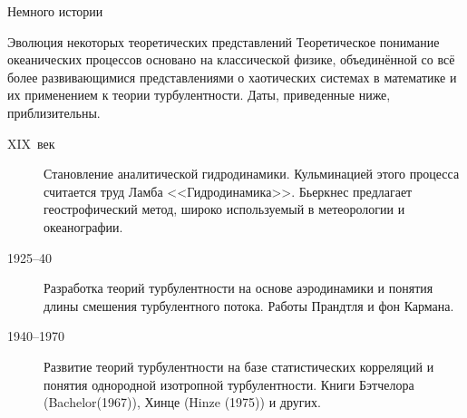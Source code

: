 \begin{chapter}{Немного истории}
\begin{section}{Эволюция некоторых теоретических представлений}
Теоретическое понимание океанических процессов основано на
классической физике, объединённой со всё более развивающимися
представлениями о хаотических системах в математике и их применением
к теории турбулентности. Даты, приведенные ниже, приблизительны.
%

\begin{description}
\item[XIX~век] Становление аналитической гидродинамики. Кульминацией
этого процесса считается труд Ламба <<Гидродинамика>>. Бьеркнес
предлагает геострофический метод, широко используемый в
метеорологии и океанографии.
%

\item[1925--40] Разработка теорий турбулентности на основе
аэродинамики и понятия длины смешения турбулентного потока. 
Работы Прандтля и фон Кармана.
%


\item[1940--1970] Развитие теорий турбулентности на базе
статистических корреляций и понятия однородной изотропной
турбулентности. Книги Бэтчелора (Bachelor(1967)), Хинце (Hinze (1975)) и
других.
%


\end{description}
\end{section}
\end{chapter}
